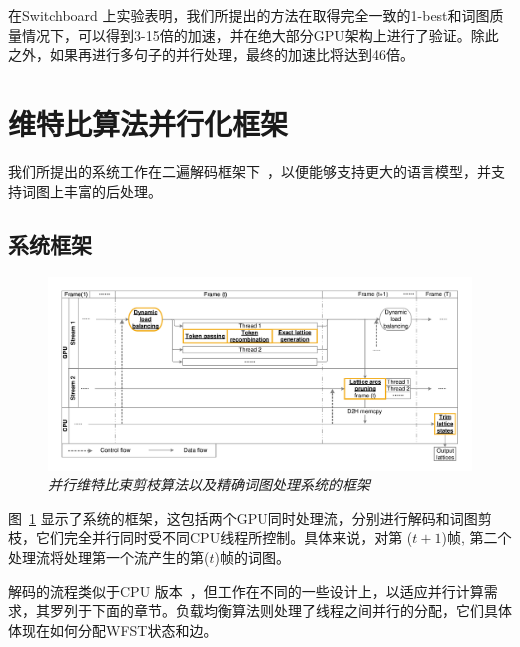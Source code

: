在Switchboard 上实验表明，我们所提出的方法在取得完全一致的1-best和词图质量情况下，可以得到3-15倍的加速，并在绝大部分GPU架构上进行了验证。除此之外，如果再进行多句子的并行处理，最终的加速比将达到46倍。


%





\section{维特比算法并行化框架}
\label{chap:gpu-viterbi}

我们所提出的系统工作在二遍解码框架下~\cite{woodland19951994}，以便能够支持更大的语言模型，并支持词图上丰富的后处理。

\subsection{系统框架}
\begin{figure}[ht]
  \centering
    \includegraphics[width=1\linewidth]{figure/gpu_framework.pdf}
    \caption{\it  并行维特比束剪枝算法以及精确词图处理系统的框架}
    \label{fig:gpu-framework}
\end{figure}
图~\ref{fig:gpu-framework} 显示了系统的框架，这包括两个GPU同时处理流，分别进行解码和词图剪枝，它们完全并行同时受不同CPU线程所控制。具体来说，对第 ($t+1$)帧, 第二个处理流将处理第一个流产生的第($t$)帧的词图。

解码的流程类似于CPU 版本~\cite{povey2011kaldi}，但工作在不同的一些设计上，以适应并行计算需求，其罗列于下面的章节。负载均衡算法则处理了线程之间并行的分配，它们具体体现在如何分配WFST状态和边。





